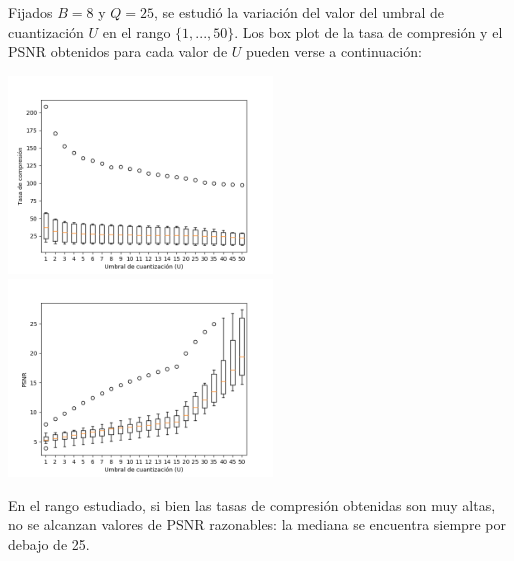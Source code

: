 \documentclass{article}
\newcommand{\set}[1]{\{#1\}}
\begin{document}
Fijados $B = 8$ y $Q = 25$, se estudió la variación del valor del
umbral de cuantización $U$ en el rango $\set{1,...,50}$.
Los box plot de la tasa de compresión y el PSNR obtenidos para
cada valor de $U$ pueden verse a continuación:
\begin{center}
  \includegraphics[width=7cm]{../imgs/output/gray_plots/ufinal_rate.png}
  \includegraphics[width=7cm]{../imgs/output/gray_plots/ufinal_psnr.png}
\end{center}
En el rango estudiado,
si bien las tasas de compresión obtenidas son muy altas,
no se alcanzan valores de PSNR razonables: la mediana se encuentra
siempre por debajo de 25.
\end{document}
